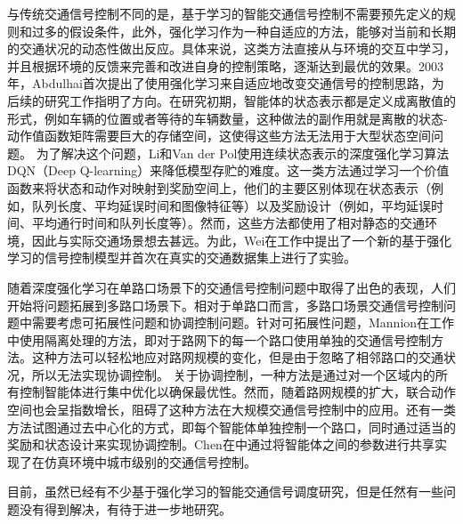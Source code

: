 与传统交通信号控制不同的是，基于学习的智能交通信号控制不需要预先定义的规则和过多的假设条件，此外，强化学习作为一种自适应的方法，能够对当前和长期的交通状况的动态性做出反应。具体来说，这类方法直接从与环境的交互中学习，并且根据环境的反馈来完善和改进自身的控制策略，逐渐达到最优的效果。2003年，Abdulhai\cite{abdulhai2003reinforcement}首次提出了使用强化学习来自适应地改变交通信号的控制思路，为后续的研究工作指明了方向。在研究初期，智能体的状态表示都是定义成离散值的形式\cite{abdoos2013holonic,abdulhai2003reinforcement,bakker2010traffic,el2013multiagent,wiering2000multi}，例如车辆的位置或者等待的车辆数量，这种做法的副作用就是离散的状态-动作值函数矩阵需要巨大的存储空间，这使得这些方法无法用于大型状态空间问题。
为了解决这个问题，Li\cite{li2016traffic}和Van der Pol\cite{van2016coordinated}使用连续状态表示的深度强化学习算法DQN（Deep Q-learning）来降低模型存贮的难度。这一类方法通过学习一个价值函数来将状态和动作对映射到奖励空间上，他们的主要区别体现在状态表示（例如，队列长度\cite{mannion2016experimental}、平均延误时间\cite{genders2016using,}和图像特征\cite{gao2017adaptive,liu2017cooperative,van2016coordinated}等）以及奖励设计（例如，平均延误时间\cite{arel2010reinforcement,van2016coordinated}、平均通行时间\cite{liu2017cooperative,van2016coordinated}和队列长度\cite{mannion2016experimental}等）。然而，这些方法都使用了相对静态的交通环境，因此与实际交通场景想去甚远。为此，Wei在工作中提出了一个新的基于强化学习的信号控制模型并首次在真实的交通数据集上进行了实验。

随着深度强化学习在单路口场景下的交通信号控制问题中取得了出色的表现，人们开始将问题拓展到多路口场景下。相对于单路口而言，多路口场景交通信号控制问题中需要考虑可拓展性问题和协调控制问题。针对可拓展性问题，Mannion在工作中使用隔离处理的方法，即对于路网下的每一个路口使用单独的交通信号控制方法。这种方法可以轻松地应对路网规模的变化，但是由于忽略了相邻路口的交通状况，所以无法实现协调控制。
关于协调控制，一种方法是通过对一个区域内的所有控制智能体进行集中优化\cite{van2016coordinated}以确保最优性。然而，随着路网规模的扩大，联合动作空间也会呈指数增长，阻碍了这种方法在大规模交通信号控制中的应用。还有一类方法试图通过去中心化的方式，即每个智能体单独控制一个路口，同时通过适当的奖励和状态设计来实现协调控制\cite{nishi2018traffic,wei2019colight}。Chen在中通过将智能体之间的参数进行共享实现了在仿真环境中城市级别的交通信号控制。

目前，虽然已经有不少基于强化学习的智能交通信号调度研究，但是任然有一些问题没有得到解决，有待于进一步地研究。

